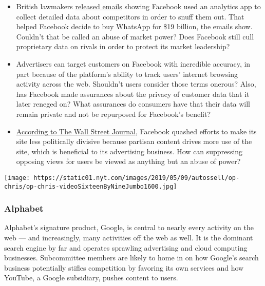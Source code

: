 \begin{itemize}
\item
  British lawmakers
  \href{https://www.nytimes.com/2018/12/05/technology/facebook-emails-privacy-data.html}{released
  emails} showing Facebook used an analytics app to collect detailed
  data about competitors in order to snuff them out. That helped
  Facebook decide to buy WhatsApp for \$19 billion, the emails show.
  Couldn't that be called an abuse of market power? Does Facebook still
  cull proprietary data on rivals in order to protect its market
  leadership?
\item
  Advertisers can target customers on Facebook with incredible accuracy,
  in part because of the platform's ability to track users' internet
  browsing activity across the web. Shouldn't users consider those terms
  onerous? Also, has Facebook made assurances about the privacy of
  customer data that it later reneged on? What assurances do consumers
  have that their data will remain private and not be repurposed for
  Facebook's benefit?
\end{itemize}

\begin{itemize}
\tightlist
\item
  \href{https://www.wsj.com/articles/facebook-knows-it-encourages-division-top-executives-nixed-solutions-11590507499}{According
  to The Wall Street Journal}, Facebook quashed efforts to make its site
  less politically divisive because partisan content drives more use of
  the site, which is beneficial to its advertising business. How can
  suppressing opposing views for users be viewed as anything but an
  abuse of power?
\end{itemize}

\texttt{[image: https://static01.nyt.com/images/2019/05/09/autossell/op-chris/op-chris-videoSixteenByNineJumbo1600.jpg]}

\hypertarget{alphabet}{%
\subsubsection{Alphabet}\label{alphabet}}

Alphabet's signature product, Google, is central to nearly every
activity on the web --- and increasingly, many activities off the web as
well. It is the dominant search engine by far and operates sprawling
advertising and cloud computing businesses. Subcommittee members are
likely to home in on how Google's search business potentially stifles
competition by favoring its own services and how YouTube, a Google
subsidiary, pushes content to users.

